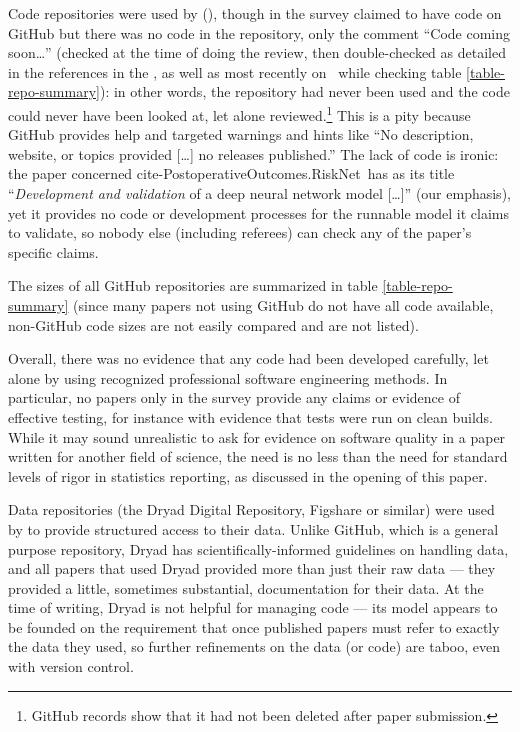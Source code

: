 \documentclass[10pt,a4paper]{article}
\begin{document}
Code repositories were used by  (\pc{\countUsesVersionControlRepository}{\dataN}), though  in the survey claimed to have code on GitHub but there was no code in the repository, only the comment ``Code coming soon\ldots'' (checked at the time of doing the review, then double-checked as detailed in the references in the \supplement, as well as most recently on \clonedate\
while checking table \ref{table-repo-summary}): in other words, the repository had never been used and the code could never have been looked at, let alone reviewed.\footnote{GitHub records show that it had not been deleted after paper submission.} This is a pity because GitHub provides help and targeted warnings and hints like ``No description, website, or topics provided [\ldots] no releases published.'' The lack of code is ironic: the paper concerned \csname cite-PostoperativeOutcomes.RiskNet\endcsname\ has as its title ``\emph{Development and validation\/} of a deep neural network model [\ldots]'' (our emphasis), yet it provides no code or development processes for the runnable model it claims to validate, so nobody else (including referees) can check any of the paper's specific claims.

The sizes of all GitHub repositories are summarized in table \ref{table-repo-summary} (since many papers not using GitHub do not have all code available, non-GitHub code sizes are not easily compared and are not listed). 

Overall, there was no evidence that any code had been developed carefully, {let alone by using recognized professional software engineering methods}. In particular, 
\ifnum \countCodetested=0
no papers
\else only 
\fi in the survey provide any claims or evidence of effective testing, for instance with evidence that tests were run on clean builds. {While it may sound unrealistic to ask for evidence on software quality in a paper written for another field of science, the need is no less than the need for standard levels of rigor in statistics reporting, as discussed in the opening of this paper.}

Data repositories (the Dryad Digital Repository, Figshare or similar) were used by  to provide structured access to their data. Unlike GitHub, which is a general purpose repository, Dryad has scientifically-informed guidelines on handling data, and all papers that used Dryad provided more than just their raw data --- they provided a little, sometimes substantial, documentation for their data. At the time of writing, Dryad is not helpful for managing code --- its model appears to be founded on the requirement that once published papers must refer to exactly the data they used, so further refinements on the data (or code) are taboo, even with version control.
\end{document}
